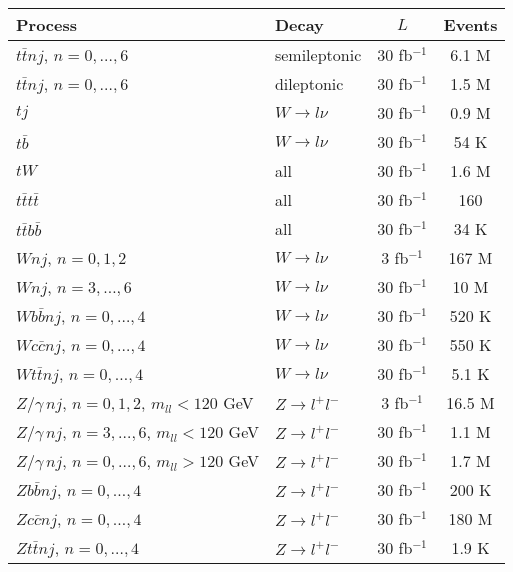 \documentclass[12pt,a4paper]{article}
\begin{document}
\begin{table}[t]
\begin{center}
\begin{small}
\begin{tabular}{llcc}
Process & Decay & $L$ & Events \\
\hline
$t \bar t nj$, $n=0,\dots,6$   & semileptonic           & 30 fb$^{-1}$   & 6.1 M \\
$t \bar t nj$, $n=0,\dots,6$   & dileptonic             & 30 fb$^{-1}$   & 1.5 M \\
$tj$                          & $W \to l \nu$       & 30 fb$^{-1}$   & 0.9 M  \\
$t\bar b$                     & $W \to l \nu$       & 30 fb$^{-1}$   & 54 K  \\
$tW$                          & all                    & 30 fb$^{-1}$   & 1.6 M   \\
$t \bar t t \bar t$           & all                    & 30 fb$^{-1}$   & 160   \\
$t \bar t b \bar b$           & all                    & 30 fb$^{-1}$   & 34 K   \\
$Wnj$, $n=0,1,2$              & $W \to l \nu$       & 3 fb$^{-1}$    & 167 M \\
$Wnj$, $n=3,\dots,6$           & $W \to l \nu$       & 30 fb$^{-1}$    & 10 M \\
$W b \bar b nj$, $n=0,\dots,4$ & $W \to l \nu$       & 30 fb$^{-1}$   & 520 K \\
$W c \bar c nj$, $n=0,\dots,4$ & $W \to l \nu$       & 30 fb$^{-1}$   & 550 K \\
$W t \bar t nj$, $n=0,\dots,4$ & $W \to l \nu$       & 30 fb$^{-1}$   & 5.1 K \\
$Z/\gamma\, nj$, $n=0,1,2$, $m_{ll} < 120$ GeV
                              & $Z \to l^+ l^-$  & 3 fb$^{-1}$    & 16.5 M \\
$Z/\gamma\, nj$, $n=3,\dots,6$, $m_{ll} < 120$ GeV
                              & $Z \to l^+ l^-$  & 30 fb$^{-1}$    & 1.1 M \\
$Z/\gamma\, nj$, $n=0,\dots,6$, $m_{ll} > 120$ GeV
                              & $Z \to l^+ l^-$  & 30 fb$^{-1}$   & 1.7 M \\
$Z b \bar b nj$, $n=0,\dots,4$ & $Z \to l^+ l^-$  & 30 fb$^{-1}$   & 200 K \\
$Z c \bar c nj$, $n=0,\dots,4$ & $Z \to l^+ l^-$  & 30 fb$^{-1}$   & 180 M \\
$Z t \bar t nj$, $n=0,\dots,4$ & $Z \to l^+ l^-$  & 30 fb$^{-1}$   & 1.9 K \\

\end{tabular}
\end{small}
\end{center}
\end{table}
\end{document}
